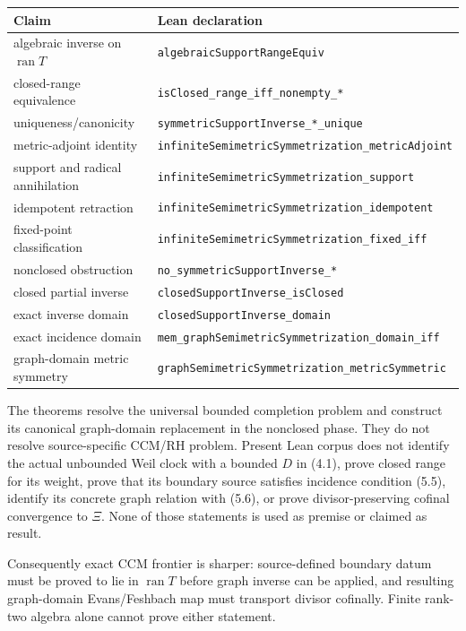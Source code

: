 \documentclass[11pt]{article}
\theoremstyle{definition}
\theoremstyle{remark}
\newcommand{\ran}{\operatorname{ran}}
\begin{document}
\begin{center}
\begin{tabular}{@{}ll@{}}
\toprule
Claim & Lean declaration \\
\midrule
algebraic inverse on $\ran T$ & \texttt{algebraicSupportRangeEquiv} \\
closed-range equivalence & \texttt{isClosed\_range\_iff\_nonempty\_*} \\
uniqueness/canonicity & \texttt{symmetricSupportInverse\_*\_unique} \\
metric-adjoint identity & \texttt{infiniteSemimetricSymmetrization\_metricAdjoint} \\
support and radical annihilation & \texttt{infiniteSemimetricSymmetrization\_support} \\
idempotent retraction & \texttt{infiniteSemimetricSymmetrization\_idempotent} \\
fixed-point classification & \texttt{infiniteSemimetricSymmetrization\_fixed\_iff} \\
nonclosed obstruction & \texttt{no\_symmetricSupportInverse\_*} \\
closed partial inverse & \texttt{closedSupportInverse\_isClosed} \\
exact inverse domain & \texttt{closedSupportInverse\_domain} \\
exact incidence domain & \texttt{mem\_graphSemimetricSymmetrization\_domain\_iff} \\
graph-domain metric symmetry & \texttt{graphSemimetricSymmetrization\_metricSymmetric} \\
\bottomrule
\end{tabular}
\end{center}

The theorems resolve the universal bounded completion problem and construct its canonical
graph-domain replacement in the nonclosed phase.  They do not resolve source-specific CCM/RH
problem.  Present Lean corpus does not
identify the actual unbounded Weil clock with a bounded $D$ in (4.1), prove closed range for its
weight, prove that its boundary source satisfies incidence condition (5.5), identify its concrete
graph relation with (5.6), or prove divisor-preserving cofinal convergence to $\Xi$.  None of those
statements is used as premise or claimed as result.

Consequently exact CCM frontier is sharper: source-defined boundary datum must be proved to lie in
$\ran T$ before graph inverse can be applied, and resulting graph-domain Evans/Feshbach map must
transport divisor cofinally.  Finite rank-two algebra alone cannot prove either statement.
\end{document}
